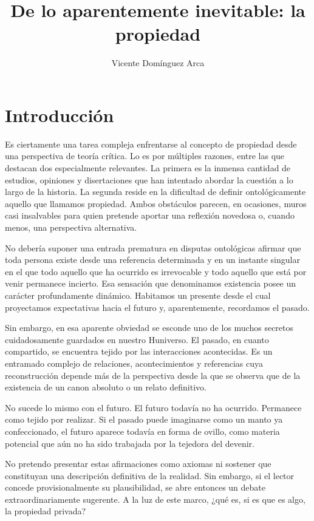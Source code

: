\documentclass[12pt,a4paper]{article}
\title{De lo aparentemente inevitable: la propiedad}
\author{Vicente Domínguez Arca}
\date{}
\begin{document}
\maketitle

\section*{Introducción}

Es ciertamente una tarea compleja enfrentarse al concepto de propiedad desde una perspectiva de teoría crítica. Lo es por múltiples razones, entre las que destacan dos especialmente relevantes. La primera es la inmensa cantidad de estudios, opiniones y disertaciones que han intentado abordar la cuestión a lo largo de la historia. La segunda reside en la dificultad de definir ontológicamente aquello que llamamos propiedad. Ambos obstáculos parecen, en ocasiones, muros casi insalvables para quien pretende aportar una reflexión novedosa o, cuando menos, una perspectiva alternativa.

No debería suponer una entrada prematura en disputas ontológicas afirmar que toda persona existe desde una referencia determinada y en un instante singular en el que todo aquello que ha ocurrido es irrevocable y todo aquello que está por venir permanece incierto. Esa sensación que denominamos existencia posee un carácter profundamente dinámico. Habitamos un presente desde el cual proyectamos expectativas hacia el futuro y, aparentemente, recordamos el pasado.

Sin embargo, en esa aparente obviedad se esconde uno de los muchos secretos cuidadosamente guardados en nuestro Huniverso. El pasado, en cuanto compartido, se encuentra tejido por las interacciones acontecidas. Es un entramado complejo de relaciones, acontecimientos y referencias cuya reconstrucción depende más de la perspectiva desde la que se observa que de la existencia de un canon absoluto o un relato definitivo.

No sucede lo mismo con el futuro. El futuro todavía no ha ocurrido. Permanece como tejido por realizar. Si el pasado puede imaginarse como un manto ya confeccionado, el futuro aparece todavía en forma de ovillo, como materia potencial que aún no ha sido trabajada por la tejedora del devenir.

No pretendo presentar estas afirmaciones como axiomas ni sostener que constituyan una descripción definitiva de la realidad. Sin embargo, si el lector concede provisionalmente su plausibilidad, se abre entonces un debate extraordinariamente sugerente. A la luz de este marco, ¿qué es, si es que es algo, la propiedad privada?
\end{document}
